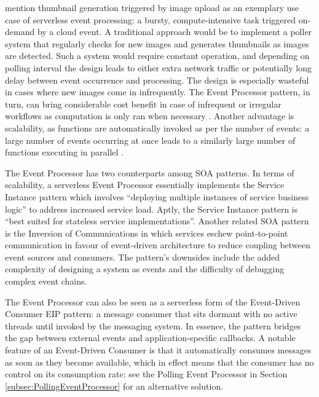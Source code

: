 \textcite{baldini17currentTrends} mention thumbnail generation triggered by image upload as an exemplary use case of serverless event processing: a bursty, compute-intensive task triggered on-demand by a cloud event. A traditional approach would be to implement a poller system that regularly checks for new images and generates thumbnails as images are detected. Such a system would require constant operation, and depending on polling interval the design leads to either extra network traffic or potentially long delay between event occurrence and processing. The design is especially wasteful in cases where new images come in infrequently. The Event Processor pattern, in turn, can bring considerable cost benefit in case of infrequent or irregular workflows as computation is only ran when necessary \parencite{hong18securingviaserverlesspatterns}. Another advantage is scalability, as functions are automatically invoked as per the number of events: a large number of events occurring at once leads to a similarly large number of functions executing in parallel \parencite{hong18securingviaserverlesspatterns}.

The Event Processor has two counterparts among SOA patterns. In terms of scalability, a serverless Event Processor essentially implements the Service Instance pattern which involves ``deploying multiple instances of service business logic'' to address increased service load. Aptly, the Service Instance pattern is ``best suited for stateless service implementations''. Another related SOA pattern is the Inversion of Communications in which services eschew point-to-point communication in favour of event-driven architecture to reduce coupling between event sources and consumers. The pattern's downsides include the added complexity of designing a system as events and the difficulty of debugging complex event chains. \parencite{rotem12soa}

The Event Processor can also be seen as a serverless form of the Event-Driven Consumer EIP pattern: a message consumer that sits dormant with no active threads until invoked by the messaging system. In essence, the pattern bridges the gap between external events and application-specific callbacks. A notable feature of an Event-Driven Consumer is that it automatically consumes messages as soon as they become available, which in effect means that the consumer has no control on its consumption rate: see the Polling Event Processor in Section \ref{subsec:PollingEventProcessor} for an alternative solution. \parencite{hohpe2004enterprise}

